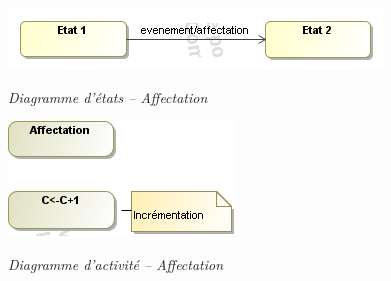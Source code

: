 \documentclass[10pt]{article}
\begin{document}
\begin{minipage}[c]{.48\linewidth}
\begin{center}
\includegraphics[width=\textwidth]{images/Affectation_stm}

\textit{Diagramme d'états -- Affectation}
\end{center}
\end{minipage} \hfill
\begin{minipage}[c]{.48\linewidth}
\begin{center}
\includegraphics[width=.6\textwidth]{images/Affectation_act}

\textit{Diagramme d'activité -- Affectation}
\end{center}
\end{minipage}
\end{document}
